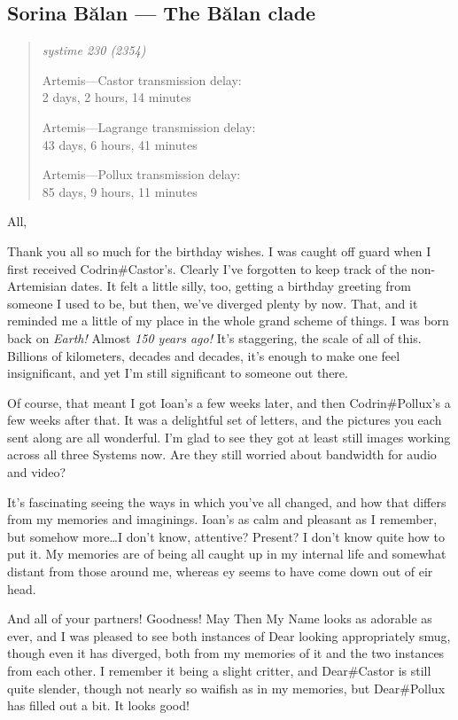 \hypertarget{sorina-bux103lan-the-bux103lan-clade}{%
\subsection{Sorina Bălan — The Bălan clade}\label{sorina-bux103lan-the-bux103lan-clade}}

\begin{quote}
\itshape
systime 230 (2354)

Artemis---Castor transmission delay:\\
2 days, 2 hours, 14 minutes

Artemis---Lagrange transmission delay:\\
43 days, 6 hours, 41 minutes

Artemis---Pollux transmission delay:\\
85 days, 9 hours, 11 minutes
\end{quote}

All,

Thank you all so much for the birthday wishes. I was caught off guard when I first received Codrin\#Castor's. Clearly I've forgotten to keep track of the non-Artemisian dates. It felt a little silly, too, getting a birthday greeting from someone I used to be, but then, we've diverged plenty by now. That, and it reminded me a little of my place in the whole grand scheme of things. I was born back on \emph{Earth!} Almost \emph{150 years ago!} It's staggering, the scale of all of this. Billions of kilometers, decades and decades, it's enough to make one feel insignificant, and yet I'm still significant to someone out there.

Of course, that meant I got Ioan's a few weeks later, and then Codrin\#Pollux's a few weeks after that. It was a delightful set of letters, and the pictures you each sent along are all wonderful. I'm glad to see they got at least still images working across all three Systems now. Are they still worried about bandwidth for audio and video?

It's fascinating seeing the ways in which you've all changed, and how that differs from my memories and imaginings. Ioan's as calm and pleasant as I remember, but somehow more\ldots I don't know, attentive? Present? I don't know quite how to put it. My memories are of being all caught up in my internal life and somewhat distant from those around me, whereas ey seems to have come down out of eir head.

And all of your partners! Goodness! May Then My Name looks as adorable as ever, and I was pleased to see both instances of Dear looking appropriately smug, though even it has diverged, both from my memories of it and the two instances from each other. I remember it being a slight critter, and Dear\#Castor is still quite slender, though not nearly so waifish as in my memories, but Dear\#Pollux has filled out a bit. It looks good!

